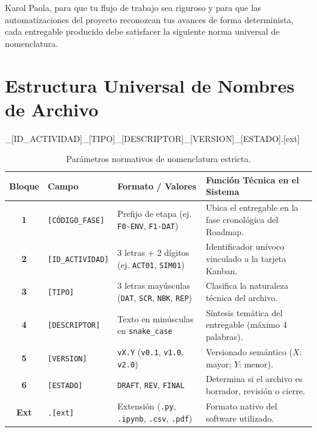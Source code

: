 \documentclass[11pt,letterpaper]{report}
\begin{document}
Karol Paola, para que tu flujo de trabajo sea riguroso y para que las automatizaciones del proyecto reconozcan tus avances de forma determinista, cada entregable producido debe satisfacer la siguiente norma universal de nomenclatura.

\section{Estructura Universal de Nombres de Archivo}

\begin{tcolorbox}[colback=codebg,colframe=buapblue,arc=2mm,boxrule=1pt]
\centering\large{}\_[ID\_ACTIVIDAD]\_[TIPO]\_[DESCRIPTOR]\_[VERSION]\_[ESTADO].[ext]
\end{tcolorbox}

\begin{table}[h!]
\centering
\small
\begin{tabularx}{\textwidth}{c l p{3.5cm} X}
\toprule
\textbf{Bloque} & \textbf{Campo} & \textbf{Formato / Valores} & \textbf{Función Técnica en el Sistema} \\
\midrule
\rowcolor{codebg}
\textbf{1} & \texttt{[CÓDIGO\_FASE]} & Prefijo de etapa (ej. \texttt{F0-ENV}, \texttt{F1-DAT}) & Ubica el entregable en la fase cronológica del Roadmap. \\
\addlinespace
\textbf{2} & \texttt{[ID\_ACTIVIDAD]} & 3 letras + 2 dígitos (ej. \texttt{ACT01}, \texttt{SIM01}) & Identificador unívoco vinculado a la tarjeta Kanban. \\
\rowcolor{codebg}
\textbf{3} & \texttt{[TIPO]} & 3 letras mayúsculas (\texttt{DAT}, \texttt{SCR}, \texttt{NBK}, \texttt{REP}) & Clasifica la naturaleza técnica del archivo. \\
\addlinespace
\textbf{4} & \texttt{[DESCRIPTOR]} & Texto en minúsculas en \texttt{snake\_case} & Síntesis temática del entregable (máximo 4 palabras). \\
\rowcolor{codebg}
\textbf{5} & \texttt{[VERSION]} & \texttt{vX.Y} (\texttt{v0.1}, \texttt{v1.0}, \texttt{v2.0}) & Versionado semántico ($X$: mayor; $Y$: menor). \\
\addlinespace
\textbf{6} & \texttt{[ESTADO]} & \texttt{DRAFT}, \texttt{REV}, \texttt{FINAL} & Determina si el archivo es borrador, revisión o cierre. \\
\rowcolor{codebg}
\textbf{Ext} & \texttt{.[ext]} & Extensión (\texttt{.py}, \texttt{.ipynb}, \texttt{.csv}, \texttt{.pdf}) & Formato nativo del software utilizado. \\
\bottomrule
\end{tabularx}
\caption{Parámetros normativos de nomenclatura estricta.}
\end{table}
\end{document}
